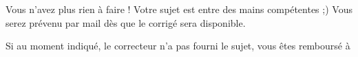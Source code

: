 ﻿Vous n'avez plus rien à faire ! Votre sujet est entre des mains compétentes ;)
Vous serez prévenu par mail dès que le corrigé sera disponible.

Si au moment indiqué, le correcteur n'a pas fourni le sujet, vous êtes remboursé à %